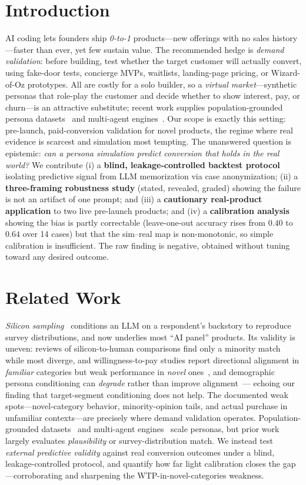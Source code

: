 \documentclass{article}
\begin{document}
\section{Introduction}
\label{sec:intro}
AI coding lets founders ship \emph{0-to-1} products---new offerings with no sales
history---faster than ever, yet few sustain value. The recommended hedge is
\emph{demand validation}: before building, test whether the target customer will
actually convert, using fake-door tests, concierge MVPs, waitlists, landing-page
pricing, or Wizard-of-Oz prototypes. All are costly for a solo builder, so a
\emph{virtual market}---synthetic personas that role-play the customer and decide
whether to show interest, pay, or churn---is an attractive substitute; recent work
supplies population-grounded persona datasets~\citep{nemotron} and multi-agent
engines~\citep{mirofish}. Our scope is exactly this setting: pre-launch,
paid-conversion validation for novel products, the regime where real evidence is
scarcest and simulation most tempting. The unanswered question is epistemic:
\emph{can a persona simulation predict conversion that holds in the real world?} We contribute (i) a \textbf{blind, leakage-controlled backtest
protocol} isolating predictive signal from LLM memorization via case
anonymization; (ii) a \textbf{three-framing robustness study} (stated, revealed,
graded) showing the failure is not an artifact of one prompt; and (iii) a
\textbf{cautionary real-product application} to two live pre-launch products; and
(iv) a \textbf{calibration analysis} showing the bias is partly correctable
(leave-one-out accuracy rises from $0.40$ to $0.64$ over 14 cases) but that the
sim--real map is non-monotonic, so simple calibration is insufficient. The raw
finding is negative, obtained without tuning toward any desired outcome.

\section{Related Work}
\label{sec:related}
\emph{Silicon sampling}~\citep{argyle2023} conditions an LLM on a respondent's
backstory to reproduce survey distributions, and now underlies most ``AI panel''
products. Its validity is uneven: reviews of silicon-to-human comparisons find
only a minority match while most diverge, and willingness-to-pay studies report
directional alignment in \emph{familiar} categories but weak performance in
\emph{novel} ones~\citep{persona_microdata}, and demographic persona conditioning
can \emph{degrade} rather than improve alignment~\citep{persona_reliability}---
echoing our finding that target-segment conditioning does not help. The documented
weak spots---novel-category behavior, minority-opinion tails, and actual purchase
in unfamiliar contexts---are precisely where demand validation operates.
Population-grounded datasets~\citep{nemotron} and multi-agent
engines~\citep{mirofish} scale personas, but prior work largely evaluates
\emph{plausibility} or survey-distribution match. We instead test \emph{external
predictive validity} against real conversion outcomes under a blind,
leakage-controlled protocol, and quantify how far light calibration closes the
gap---corroborating and sharpening the WTP-in-novel-categories weakness.
\end{document}
